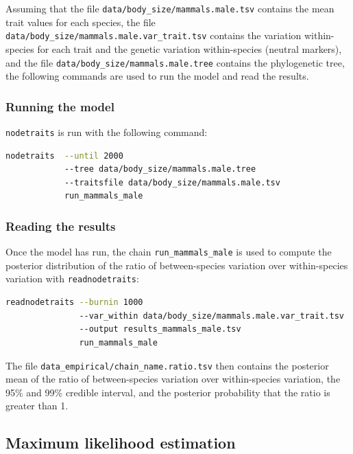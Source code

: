 \documentclass{article}
\providecommand{\DIFdelbegin}{} %
\providecommand{\DIFdelend}{} %
\newcommand{\DIFscaledelfig}{0.5}
\newlength{\DIFdelgraphicswidth} %
\newlength{\DIFdelgraphicsheight} %
\newcommand{\DIFdelincludegraphics}[2][]{%
\sbox{\DIFdelgraphicsbox}{\DIFOincludegraphics[#1]{#2}}%
\settoboxwidth{\DIFdelgraphicswidth}{\DIFdelgraphicsbox} %
\settoboxtotalheight{\DIFdelgraphicsheight}{\DIFdelgraphicsbox} %
\scalebox{\DIFscaledelfig}{%
\parbox[b]{\DIFdelgraphicswidth}{\usebox{\DIFdelgraphicsbox}\\[-\baselineskip] \rule{\DIFdelgraphicswidth}{0em}}\llap{\resizebox{\DIFdelgraphicswidth}{\DIFdelgraphicsheight}{%
\setlength{\unitlength}{\DIFdelgraphicswidth}%
\begin{picture}(1,1)%
\thicklines\linethickness{2pt} %
{\color[rgb]{1,0,0}\put(0,0){\framebox(1,1){}}}%
{\color[rgb]{1,0,0}\put(0,0){\line( 1,1){1}}}%
{\color[rgb]{1,0,0}\put(0,1){\line(1,-1){1}}}%
\end{picture}%
}\hspace*{3pt}}} %
} %
\DeclareRobustCommand{\DIFdelbegin}{\DIFOdelbegin \let\includegraphics\DIFdelincludegraphics} %
\DeclareRobustCommand{\DIFdelend}{\DIFOaddend \let\includegraphics\DIFOincludegraphics} %
\begin{document}
Assuming that the file \texttt{data/body\_size/mammals.male.tsv} contains the mean trait values for each species, the file \texttt{data/body\_size/mammals.male.var\_trait.tsv} contains the variation within-species for each trait and the genetic variation within-species (neutral markers), and the file \texttt{data/body\_size/mammals.male.tree} contains the phylogenetic tree, the following commands are used to run the model and read the results.

\subsubsection{Running the model}
\DIFdelbegin %
\DIFdelend \texttt{nodetraits} is run with the following command:
\begin{lstlisting}[language = sh,label={lst:nodetraits-run}]
nodetraits  --until 2000
            --tree data/body_size/mammals.male.tree
            --traitsfile data/body_size/mammals.male.tsv
            run_mammals_male
\end{lstlisting}

\subsubsection{Reading the results}
\DIFdelbegin %
\DIFdelend Once the model has run, the chain \texttt{run\_mammals\_male} is used to compute the posterior distribution of the ratio of between-species variation over within-species variation with \texttt{readnodetraits}:
\begin{lstlisting}[language = sh,label={lst:readnodetraits-rho}]
readnodetraits --burnin 1000
               --var_within data/body_size/mammals.male.var_trait.tsv
               --output results_mammals_male.tsv
               run_mammals_male
\end{lstlisting}
The file \texttt{data\_empirical/chain\_name.ratio.tsv} then contains the posterior mean of the ratio of between-species variation over within-species variation, the 95\% and 99\% credible interval, and the posterior probability that the ratio is greater than 1.

\subsection{Maximum likelihood estimation}\label{subsec:maximum-likelihood-estimation}
\end{document}
